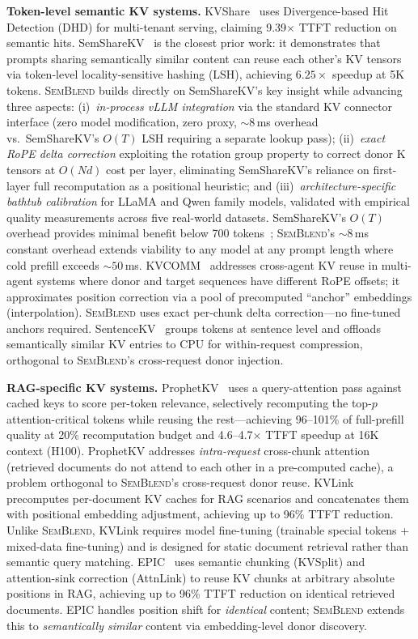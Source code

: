 \documentclass[10pt,twocolumn]{article}
\newcommand{\semblend}{\textsc{SemBlend}\xspace}
\begin{document}
\textbf{Token-level semantic KV systems.}
KVShare~\cite{kvshare} uses Divergence-based Hit Detection (DHD)
for multi-tenant serving, claiming 9.39$\times$ TTFT reduction on
semantic hits. SemShareKV~\cite{semsharekv} is the closest prior work:
it demonstrates that prompts sharing semantically similar content can
reuse each other's KV tensors via token-level locality-sensitive hashing
(LSH), achieving $6.25\times$ speedup at 5K tokens. \semblend builds
directly on SemShareKV's key insight while advancing three aspects:
(i)~\emph{in-process vLLM integration} via the standard KV connector
interface (zero model modification, zero proxy, ${\sim}8$\,ms overhead vs.\
SemShareKV's $O(T)$ LSH requiring a separate lookup pass); (ii)~\emph{exact
RoPE delta correction} exploiting the rotation group property to correct
donor K tensors at $O(Nd)$ cost per layer, eliminating SemShareKV's
reliance on first-layer full recomputation as a positional heuristic;
and (iii)~\emph{architecture-specific bathtub calibration} for LLaMA
and Qwen family models, validated with empirical quality measurements
across five real-world datasets. SemShareKV's $O(T)$ overhead provides
minimal benefit below 700 tokens~\cite{semsharekv}; \semblend's ${\sim}8$\,ms
constant overhead extends viability to any model at any prompt length
where cold prefill exceeds ${\sim}50$\,ms.
KVCOMM~\cite{kvcomm} addresses cross-agent KV reuse in multi-agent
systems where donor and target sequences have different RoPE offsets;
it approximates position correction via a pool of precomputed
``anchor'' embeddings (interpolation). \semblend uses exact per-chunk
delta correction---no fine-tuned anchors required.
SentenceKV~\cite{sentencekv} groups tokens at sentence level and
offloads semantically similar KV entries to CPU for within-request
compression, orthogonal to \semblend's cross-request donor injection.

\textbf{RAG-specific KV systems.}
ProphetKV~\cite{prophetkv} uses a query-attention pass against cached
keys to score per-token relevance, selectively recomputing the
top-$p$ attention-critical tokens while reusing the rest---achieving
96--101\% of full-prefill quality at 20\% recomputation budget and
4.6--4.7$\times$ TTFT speedup at 16K context (H100). ProphetKV
addresses \emph{intra-request} cross-chunk attention (retrieved
documents do not attend to each other in a pre-computed cache),
a problem orthogonal to \semblend's cross-request donor reuse.
KVLink~\cite{kvlink} precomputes
per-document KV caches for RAG scenarios and concatenates them with
positional embedding adjustment, achieving up to 96\% TTFT reduction.
Unlike \semblend, KVLink requires model fine-tuning (trainable special
tokens + mixed-data fine-tuning) and is designed for static document
retrieval rather than semantic query matching.
EPIC~\cite{epic} uses semantic chunking (KVSplit) and attention-sink
correction (AttnLink) to reuse KV chunks at arbitrary absolute
positions in RAG, achieving up to 96\% TTFT reduction on identical
retrieved documents. EPIC handles position shift for \emph{identical}
content; \semblend extends this to \emph{semantically similar} content
via embedding-level donor discovery.
\end{document}
